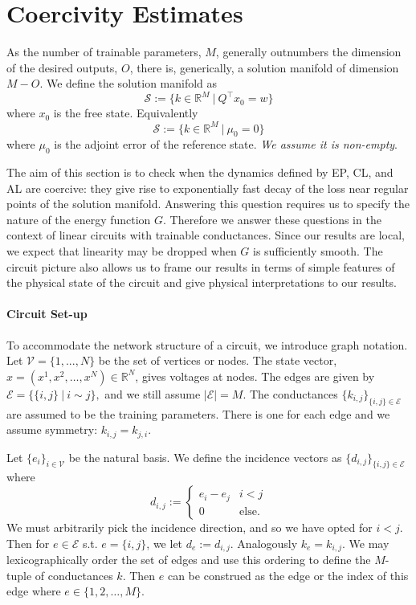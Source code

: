 \documentclass{siamart}
\begin{document}
\section{Coercivity Estimates}
\label{sec:coercivity}
As the number of trainable parameters, $M$, generally outnumbers the dimension of the desired outputs, $O$, there is, generically, a solution manifold of dimension $M-O$. We define the solution manifold as 
\begin{equation}
    \mathcal{S} := \{ k \in \mathbb{R}^M \ |  \ Q^\top x_0 =w\}
\end{equation}
where $x_0$ is the free state. Equivalently 
\begin{equation}
    \mathcal{S} := \{ k \in \mathbb{R}^M \ |  \ \mu_0 = 0\}
\end{equation}
where $\mu_0$ is the adjoint error of the reference state. \textit{We assume it is non-empty}. 

The aim of this section is to check when the dynamics defined by EP, CL, and AL are coercive: they give rise to exponentially fast decay of the loss near regular points of the solution manifold. Answering this question requires us to specify the nature of the energy function $G$. Therefore we answer these questions in the context of linear circuits with trainable conductances. Since our results are local, we expect that linearity may be dropped when $G$ is sufficiently smooth. The circuit picture also allows us to frame our results in terms of simple features of the physical state of the circuit and give physical interpretations to our results. 

\paragraph{Circuit Set-up}
To accommodate the network structure of a circuit, we introduce graph notation. Let $\mathcal{V}=\{1,...,N\}$ be the set of vertices or nodes. The state vector, $x=(x^1,x^2,\ldots,x^N) \in \mathbb{R}^N$, gives voltages at nodes. The edges are given by $\mathcal{E}=\{\{i,j\} \ | \ i \sim j\},$ and we still assume $|\mathcal{E}| =M$. The conductances $\{k_{i,j}\}_{\{i,j\} \in \mathcal{E}}$ are assumed to be the training parameters. There is one for each edge and we assume symmetry: $k_{i,j}=k_{j,i}$.

Let $\{e_i\}_{i \in \mathcal{V}}$ be the natural basis. We define the incidence vectors as $\{d_{i,j}\}_{\{i,j\} \in \mathcal{E}}$ where 
\[d_{i,j} := \begin{cases} e_i-e_j & i<j
\\ 0 & \text{else}.
\end{cases}\]
We must arbitrarily pick the incidence direction, and so we have opted for $i<j$. Then for $e \in \mathcal{E}$ s.t. $e =\{i,j\}$, we let $d_e:=d_{i,j}$. Analogously $k_e =k_{i,j}.$ We may lexicographically order the set of edges and use this ordering to define the $M$-tuple of conductances $k$. Then $e$ can be construed as the edge or the index of this edge where $e \in \{1,2,\ldots,M\}.$
\end{document}
